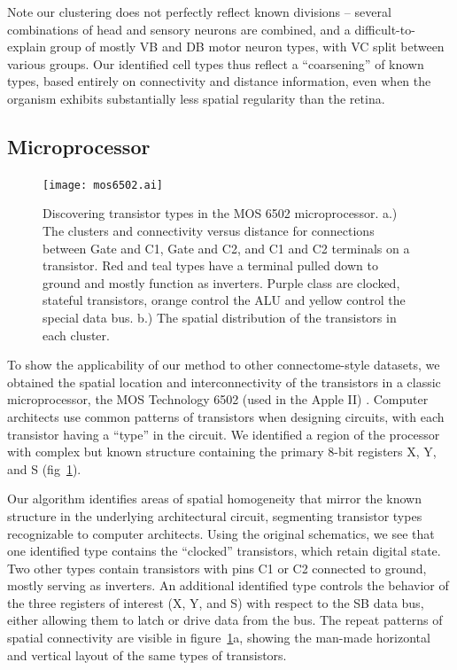 \documentclass{article}
\begin{document}
Note our clustering does not perfectly reflect known divisions --
several combinations of head and sensory neurons are combined, and a
difficult-to-explain group of mostly VB and DB motor neuron types,
with VC split between various groups. Our identified cell types thus
reflect a ``coarsening'' of known types, based entirely on
connectivity and distance information, even when the organism exhibits
substantially less spatial regularity than the retina.



\subsection{Microprocessor}
\begin{figure}
  \centering 
  \centerline{\texttt{[image: mos6502.ai]}}
  \caption{Discovering transistor types in the MOS 6502
    microprocessor. a.) The clusters and connectivity versus distance
    for connections between Gate and C1, Gate and C2, and C1 and C2
    terminals on a transistor. Red and teal types have a terminal
    pulled down to ground and mostly function as inverters. Purple
    class are clocked, stateful transistors, orange control the ALU
    and yellow control the special data bus. b.) The spatial
    distribution of the transistors in each cluster. }
\label{fig:mos6502}
\end{figure}

To show the applicability of our method to other connectome-style
datasets, we obtained the spatial location and interconnectivity of
the transistors in a classic microprocessor, the MOS Technology 6502
(used in the Apple II) \autocite{James2010}. Computer architects use
common patterns of transistors when designing circuits, with each
transistor having a ``type'' in the circuit. We identified a region of
the processor with complex but known structure containing the primary
8-bit registers X, Y, and S (fig~\ref{fig:mos6502}).

Our algorithm identifies areas of spatial homogeneity that mirror the
known structure in the underlying architectural circuit, segmenting
transistor types recognizable to computer architects. Using the
original schematics, we see that one identified type contains the
``clocked'' transistors, which retain digital state. Two other types
contain transistors with pins C1 or C2 connected to ground, mostly
serving as inverters.  An additional identified type controls the
behavior of the three registers of interest (X, Y, and S) with respect
to the SB data bus, either allowing them to latch or drive data from
the bus. The repeat patterns of spatial connectivity are visible in
figure~\ref{fig:mos6502}a, showing the man-made horizontal and
vertical layout of the same types of transistors.
\end{document}
